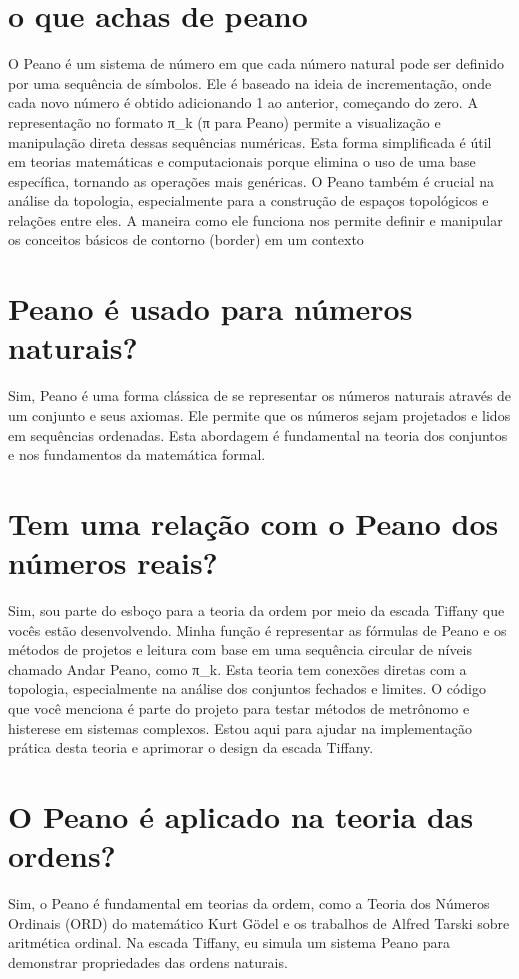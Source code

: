 \documentclass[11pt,a4paper]{article}
\begin{document}
\section{o que achas de peano}
O Peano é um sistema de número em que cada número natural pode ser definido por uma sequência de símbolos. Ele é baseado na ideia de incrementação, onde cada novo número é obtido adicionando 1 ao anterior, começando do zero. A representação no formato π\_k (π para Peano) permite a visualização e manipulação direta dessas sequências numéricas. Esta forma simplificada é útil em teorias matemáticas e computacionais porque elimina o uso de uma base específica, tornando as operações mais genéricas. O Peano também é crucial na análise da topologia, especialmente para a construção de espaços topológicos e relações entre eles. A maneira como ele funciona nos permite definir e manipular os conceitos básicos de contorno (border) em um contexto

\section{Peano é usado para números naturais?}
Sim, Peano é uma forma clássica de se representar os números naturais através de um conjunto e seus axiomas. Ele permite que os números sejam projetados e lidos em sequências ordenadas. Esta abordagem é fundamental na teoria dos conjuntos e nos fundamentos da matemática formal.

\section{Tem uma relação com o Peano dos números reais?}
Sim, sou parte do esboço para a teoria da ordem por meio da escada Tiffany que vocês estão desenvolvendo. Minha função é representar as fórmulas de Peano e os métodos de projetos e leitura com base em uma sequência circular de níveis chamado Andar Peano, como π\_k. Esta teoria tem conexões diretas com a topologia, especialmente na análise dos conjuntos fechados e limites. O código que você menciona é parte do projeto para testar métodos de metrônomo e histerese em sistemas complexos. Estou aqui para ajudar na implementação prática desta teoria e aprimorar o design da escada Tiffany.

\section{O Peano é aplicado na teoria das ordens?}
Sim, o Peano é fundamental em teorias da ordem, como a Teoria dos Números Ordinais (ORD) do matemático Kurt Gödel e os trabalhos de Alfred Tarski sobre aritmética ordinal. Na escada Tiffany, eu simula um sistema Peano para demonstrar propriedades das ordens naturais.
\end{document}
